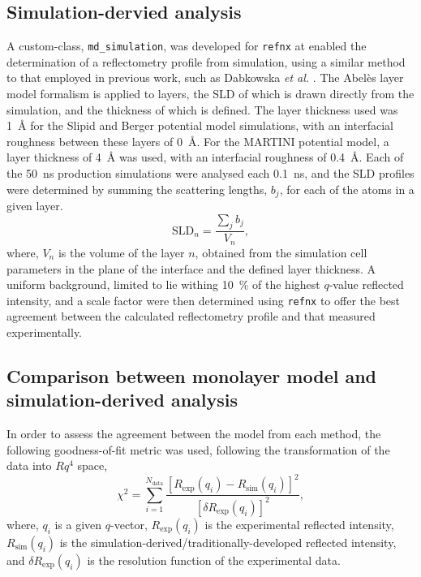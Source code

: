 \subsection{Simulation-dervied analysis}
A custom-class, \texttt{md\_simulation}, was developed for \texttt{refnx} \cite{nelson_refnx_2019,nelson_refnx_2019-1} at enabled the determination of a reflectometry profile from simulation, using a similar method to that employed in previous work, such as Dabkowska \emph{et al.} \cite{dabkowska_modulation_2014}.
The Abel\`{e}s layer model formalism is applied to layers, the SLD of which is drawn directly from the simulation, and the thickness of which is defined.
The layer thickness used was \SI{1}{\angstrom} for the Slipid and Berger potential model simulations, with an interfacial roughness between these layers of \SI{0}{\angstrom}.
For the MARTINI potential model, a layer thickness of \SI{4}{\angstrom} was used, with an interfacial roughness of \SI{0.4}{\angstrom}. Each of the \SI{50}{\nano\second} production simulations were analysed each \SI{0.1}{\nano\second}, and the SLD profiles were determined by summing the scattering lengths, $b_j$, for each of the atoms in a given layer.
%
\begin{equation}
\text{SLD}_n = \frac{\sum_j b_j}{V_n},
\end{equation}
%
where, $V_n$ is the volume of the layer $n$, obtained from the simulation cell parameters in the plane of the interface and the defined layer thickness.
A uniform background, limited to lie withing \SI{10}{\percent} of the highest $q$-value reflected intensity, and a scale factor were then determined using \texttt{refnx} to offer the best agreement between the calculated reflectometry profile and that measured experimentally.

\subsection{Comparison between monolayer model and simulation-derived analysis}
In order to assess the agreement between the model from each method, the following goodness-of-fit metric was used, following the transformation of the data into $Rq^4$ space,
%
\begin{equation}
\chi^2 = \sum_{i=1}^{N_{\text{data}}}{\frac{[R_{\text{exp}}(q_i) - R_{\text{sim}}(q_i)]^2}{[\delta R_{\text{exp}}(q_i)]^2}},
\end{equation}
%
where, $q_i$ is a given $q$-vector, $R_{\text{exp}}(q_i)$ is the experimental reflected intensity, $R_{\text{sim}}(q_i)$ is the simulation-derived/traditionally-developed reflected intensity, and $\delta R_{\text{exp}}(q_i)$ is the resolution function of the experimental data.


